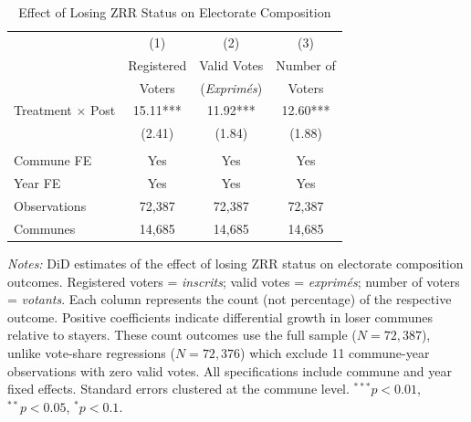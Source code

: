 \begin{table}[htbp]
\centering
\caption{Effect of Losing ZRR Status on Electorate Composition}
\label{tab:denominator}
\begin{tabular}{lccc}
\toprule
 & (1) & (2) & (3) \\
 & Registered & Valid Votes & Number of \\
 & Voters & (\textit{Exprim\'{e}s}) & Voters \\
\midrule
Treatment $\times$ Post & 15.11*** & 11.92*** & 12.60*** \\
 & (2.41) & (1.84) & (1.88) \\
 & & & \\
Commune FE & Yes & Yes & Yes \\
Year FE & Yes & Yes & Yes \\
\midrule
Observations & 72{,}387 & 72{,}387 & 72{,}387 \\
Communes & 14{,}685 & 14{,}685 & 14{,}685 \\
\bottomrule
\end{tabular}
\vspace{0.3em}
\parbox{\textwidth}{\footnotesize
\textit{Notes:} DiD estimates of the effect of losing ZRR status on electorate composition outcomes.
Registered voters = \textit{inscrits}; valid votes = \textit{exprim\'{e}s}; number of voters = \textit{votants}.
Each column represents the count (not percentage) of the respective outcome.
Positive coefficients indicate differential growth in loser communes relative to stayers.
These count outcomes use the full sample ($N = 72{,}387$), unlike vote-share regressions ($N = 72{,}376$) which exclude 11 commune-year observations with zero valid votes.
All specifications include commune and year fixed effects. Standard errors clustered at the commune level.
$^{***}p<0.01$, $^{**}p<0.05$, $^{*}p<0.1$.}
\end{table}
